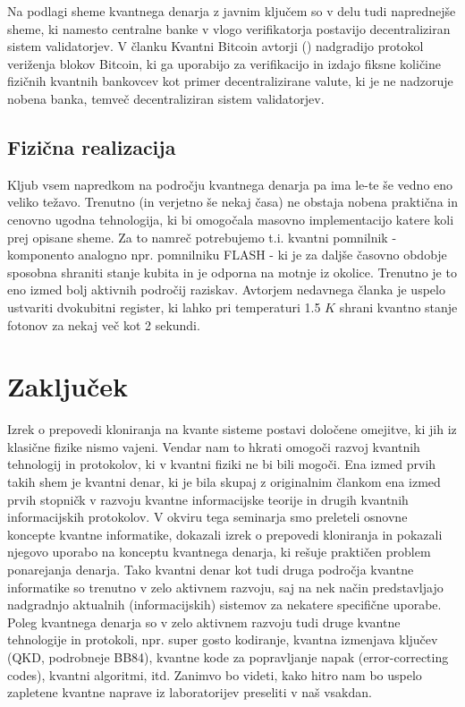 \documentclass[12pt]{article}
\begin{document}
Na podlagi sheme kvantnega denarja z javnim ključem \cite{aaronsonQuantumMoneyHidden2012} so v delu tudi naprednejše sheme, ki namesto centralne banke v vlogo verifikatorja postavijo decentraliziran sistem validatorjev. V članku Kvantni Bitcoin avtorji (\cite{jogenforsQuantumBitcoinAnonymous2019}) nadgradijo protokol veriženja blokov Bitcoin, ki ga uporabijo za verifikacijo in izdajo fiksne količine fizičnih kvantnih bankovcev kot primer decentralizirane valute, ki je ne nadzoruje nobena banka, temveč decentraliziran sistem validatorjev.   

\subsection{Fizična realizacija}
Kljub vsem napredkom na področju kvantnega denarja pa ima le-te še vedno eno veliko težavo. Trenutno (in verjetno še nekaj časa) ne obstaja nobena praktična in cenovno ugodna tehnologija, ki bi omogočala masovno implementacijo katere koli prej opisane sheme. Za to namreč potrebujemo t.i. kvantni pomnilnik - komponento analogno npr. pomnilniku FLASH - ki je za daljše časovno obdobje sposobna shraniti stanje kubita in je odporna na motnje iz okolice. Trenutno je to eno izmed bolj aktivnih področij raziskav. Avtorjem nedavnega članka \cite{RobustMultiqubitQuantum} je uspelo ustvariti dvokubitni register, ki lahko pri temperaturi 1.5 $K$ shrani kvantno stanje fotonov za nekaj več kot 2 sekundi.  

\section{Zaključek}

Izrek o prepovedi kloniranja na kvante sisteme postavi določene omejitve, ki jih iz klasične fizike nismo vajeni. Vendar nam to hkrati omogoči razvoj kvantnih tehnologij in protokolov, ki v kvantni fiziki ne bi bili mogoči. Ena izmed prvih takih shem je kvantni denar, ki je bila skupaj z originalnim člankom ena izmed prvih stopničk v razvoju kvantne informacijske teorije in drugih kvantnih informacijskih protokolov. V okviru tega seminarja smo preleteli osnovne koncepte kvantne informatike, dokazali izrek o prepovedi kloniranja in pokazali njegovo uporabo na konceptu kvantnega denarja, ki rešuje praktičen problem ponarejanja denarja. Tako kvantni denar kot tudi druga področja kvantne informatike so trenutno v zelo aktivnem razvoju, saj na nek način predstavljajo nadgradnjo aktualnih (informacijskih) sistemov za nekatere specifične uporabe. Poleg kvantnega denarja so v zelo aktivnem razvoju tudi druge kvantne tehnologije in protokoli, npr. super gosto kodiranje, kvantna izmenjava ključev (QKD, podrobneje BB84), kvantne kode za popravljanje napak (error-correcting codes), kvantni algoritmi, itd. Zanimvo bo videti, kako hitro nam bo uspelo zapletene kvantne naprave iz laboratorijev preseliti v naš vsakdan.

\pagebreak
       
 \printbibliography[heading=bibintoc,title={Literatura}]
    
\end{document}
